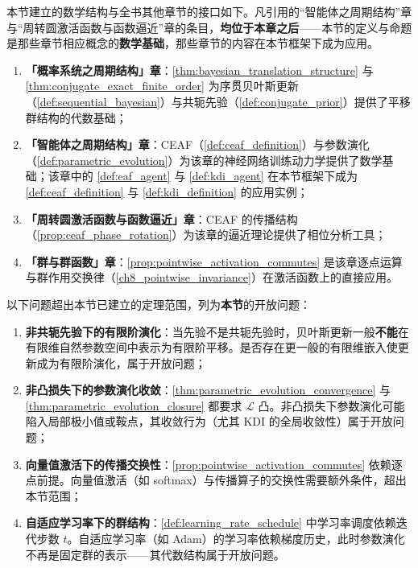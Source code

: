 \begin{remark}[与全书其他章节的接口]\label{rem:information_evolution_interfaces}
本节建立的数学结构与全书其他章节的接口如下。凡引用的“智能体之周期结构”章与“周转圆激活函数与函数逼近”章的条目，\textbf{均位于本章之后}——本节的定义与命题是那些章节相应概念的\textbf{数学基础}，那些章节的内容在本节框架下成为应用。

\begin{enumerate}[label=(\roman*)]
    \item \textbf{「概率系统之周期结构」章}：\cref{thm:bayesian_translation_structure} 与 \cref{thm:conjugate_exact_finite_order} 为序贯贝叶斯更新（\cref{def:sequential_bayesian}）与共轭先验（\cref{def:conjugate_prior}）提供了平移群结构的代数基础；
    \item \textbf{「智能体之周期结构」章}：CEAF（\cref{def:ceaf_definition}）与参数演化（\cref{def:parametric_evolution}）为该章的神经网络训练动力学提供了数学基础；该章中的 \cref{def:eaf_agent} 与 \cref{def:kdi_agent} 在本节框架下成为 \cref{def:ceaf_definition} 与 \cref{def:kdi_definition} 的应用实例；
    \item \textbf{「周转圆激活函数与函数逼近」章}：CEAF 的传播结构（\cref{prop:ceaf_phase_rotation}）为该章的逼近理论提供了相位分析工具；
    \item \textbf{「群与群函数」章}：\cref{prop:pointwise_activation_commutes} 是该章逐点运算与群作用交换律（\cref{ch8_pointwise_invariance}）在激活函数上的直接应用。
\end{enumerate}
\end{remark}

\begin{remark}[本节开放问题]\label{rem:information_evolution_open}
以下问题超出本节已建立的定理范围，列为\textbf{本节}的开放问题：
\begin{enumerate}[label=(\roman*)]
    \item \textbf{非共轭先验下的有限阶演化}：当先验不是共轭先验时，贝叶斯更新一般\textbf{不能}在有限维自然参数空间中表示为有限阶平移。是否存在更一般的有限维嵌入使更新成为有限阶演化，属于开放问题；
    \item \textbf{非凸损失下的参数演化收敛}：\cref{thm:parametric_evolution_convergence} 与 \cref{thm:parametric_evolution_closure} 都要求 $\mathcal{L}$ 凸。非凸损失下参数演化可能陷入局部极小值或鞍点，其收敛行为（尤其 KDI 的全局收敛性）属于开放问题；
    \item \textbf{向量值激活下的传播交换性}：\cref{prop:pointwise_activation_commutes} 依赖逐点前提。向量值激活（如 softmax）与传播算子的交换性需要额外条件，超出本节范围；
    \item \textbf{自适应学习率下的群结构}：\cref{def:learning_rate_schedule} 中学习率调度依赖迭代步数 $t$。自适应学习率（如 Adam）的学习率依赖梯度历史，此时参数演化不再是固定群的表示——其代数结构属于开放问题。
\end{enumerate}
\end{remark}

